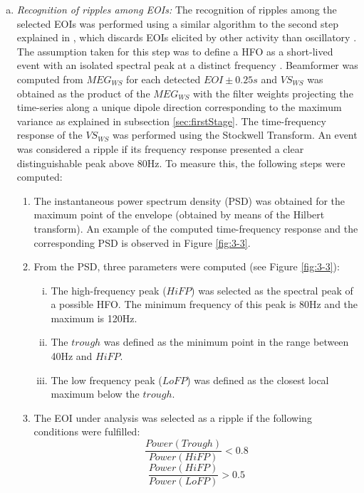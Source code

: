 \begin{enumerate}[(a)]
\item \textit{Recognition of ripples among EOIs:} The recognition of ripples among the selected EOIs was performed using a similar algorithm to the second step explained in \citep{Burnos2014}, which discards EOIs elicited by other activity than oscillatory \citep{Jacobs2012,Otsubo2008,Muthukumaraswamy2013}. The assumption taken for this step was to define a HFO as a short-lived event with an isolated spectral peak at a distinct frequency \citep{Crepon2010,Cho2012}. Beamformer was computed from $MEG_{WS}$ for each detected $ EOI \pm 0.25s $ and $VS_{WS}$ was obtained as the product of the $MEG_{WS}$ with the filter weights projecting the time-series along a unique dipole direction corresponding to the maximum variance as explained in subsection \ref{sec:firstStage}. The time-frequency response of the $VS_{WS}$ was performed using the Stockwell Transform. An event was considered a ripple if its frequency response presented a clear distinguishable peak above 80Hz. To measure this, the following steps were computed: 
  \begin{enumerate}[(1)]
  	\item The instantaneous power spectrum density (PSD) was obtained for the maximum point of the envelope (obtained by means of the Hilbert transform). An example of the computed time-frequency response and the corresponding PSD is observed in Figure \ref{fig:3-3}. 
    \item From the PSD, three parameters were computed (see Figure \ref{fig:3-3}):
    \begin{enumerate}[(i)]
    \item The high-frequency peak ($HiFP$) was selected as the spectral peak of a possible HFO. The minimum frequency of this peak is 80Hz and the maximum is 120Hz. 
    \item The $trough$ was defined as the minimum point in the range between 40Hz and $HiFP$.
    \item The low frequency peak ($LoFP$) was defined as the closest local maximum below the $trough$. 
    \end{enumerate}
\item The EOI under analysis was selected as a ripple if the following conditions were fulfilled:
    \begin{equation}
    \frac{Power(Trough)}{Power(HiFP)} < 0.8
    \end{equation}
    \begin{equation}
    \frac{Power(HiFP)}{Power(LoFP)} > 0.5
    \end{equation}
  \end{enumerate}


\end{enumerate}
